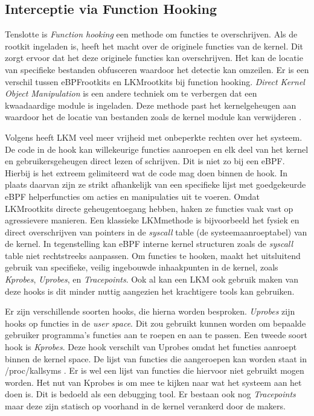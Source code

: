 \subsection{Interceptie via Function Hooking}
Tenslotte is \emph{Function hooking} een methode om functies te overschrijven. Als de rootkit ingeladen is, heeft het macht over de originele functies van de kernel. Dit zorgt ervoor dat het deze originele functies kan overschrijven. Het kan de locatie van specifieke bestanden obfusceren waardoor het detectie kan omzeilen. Er is een verschil tussen eBPF\-rootkits en LKM\-rootkits bij function hooking. \emph{Direct Kernel Object Manipulation} is een andere techniek om te verbergen dat een kwaadaardige module is ingeladen. Deze methode past het kernelgeheugen aan waardoor het de locatie van bestanden zoals de kernel module kan verwijderen \autocite{nagy2025detecting}.

Volgens \textcite{zacharia-mansouri-2026-NReUKT} heeft LKM veel meer vrijheid met onbeperkte rechten over het systeem. De code in de hook kan willekeurige functies aanroepen en elk deel van het kernel\- en gebruikersgeheugen direct lezen of schrijven. Dit is niet zo bij een eBPF. Hierbij is het extreem gelimiteerd wat de code mag doen binnen de hook. In plaats daarvan zijn ze strikt afhankelijk van een specifieke lijst met goedgekeurde eBPF helper\-functies om acties en manipulaties uit te voeren. Omdat LKM\-rootkits directe geheugentoegang hebben, haken ze functies vaak vast op agressievere manieren. Een klassieke LKM\-methode is bijvoorbeeld het fysiek en direct overschrijven van pointers in de \emph{syscall} table (de systeemaanroeptabel) van de kernel. In tegenstelling kan eBPF interne kernel structuren zoals de \emph{syscall} table niet rechtstreeks aanpassen. Om functies te hooken, maakt het uitsluitend gebruik van specifieke, veilig ingebouwde inhaakpunten in de kernel, zoals \emph{Kprobes}, \emph{Uprobes}, en \emph{Tracepoints}. Ook al kan een LKM ook gebruik maken van deze hooks is dit minder nuttig aangezien het krachtigere tools kan gebruiken.

Er zijn verschillende soorten hooks, die hierna worden besproken. \emph{Uprobes} zijn hooks op functies in de \emph{user space}. Dit zou gebruikt kunnen worden om bepaalde gebruiker programma's functies aan te roepen en aan te passen. Een tweede soort hook is \emph{Kprobes}. Deze hook verschilt van Uprobes omdat het functies aanroept binnen de kernel space. De lijst van functies die aangeroepen kan worden staat in /proc/kallsyms \autocite{Heredia2021}. Er is wel een lijst van functies die hiervoor niet gebruikt mogen worden. Het nut van Kprobes is om mee te kijken naar wat het systeem aan het doen is. Dit is bedoeld als een debugging tool. 
Er bestaan ook nog \emph{Tracepoints} maar deze zijn statisch op voorhand in de kernel verankerd door de makers.

